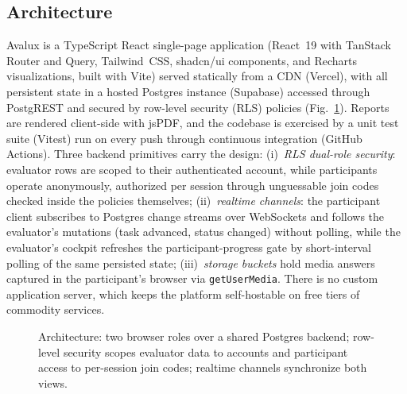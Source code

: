\documentclass[conference]{IEEEtran}
\begin{document}
\subsection{Architecture}
Avalux is a TypeScript React single-page application (React~19 with
TanStack Router and Query, Tailwind~CSS, shadcn/ui components, and
Recharts visualizations, built with Vite) served statically from a CDN
(Vercel), with all persistent state in a hosted Postgres instance
(Supabase) accessed through PostgREST and secured by row-level security
(RLS) policies (Fig.~\ref{fig:arch}). Reports are rendered client-side
with jsPDF, and the codebase is exercised by a unit test suite (Vitest)
run on every push through continuous integration (GitHub Actions). Three backend
primitives carry the design: (i)~\emph{RLS dual-role security}: evaluator
rows are scoped to their authenticated account, while participants operate
anonymously, authorized per session through unguessable join codes checked
inside the policies themselves; (ii)~\emph{realtime channels}: the participant client subscribes to
Postgres change streams over WebSockets and follows the evaluator's
mutations (task advanced, status changed) without polling, while the
evaluator's cockpit refreshes the participant-progress gate by
short-interval polling of the same persisted state; (iii)~\emph{storage buckets} hold media answers captured in the
participant's browser via \texttt{getUserMedia}. There is no custom
application server, which keeps the platform self-hostable on free tiers
of commodity services.

\begin{figure}[t]
\centering
{}
\caption{Architecture: two browser roles over a shared Postgres backend;
row-level security scopes evaluator data to accounts and participant
access to per-session join codes; realtime channels synchronize both
views.}
\label{fig:arch}
\end{figure}
\end{document}
